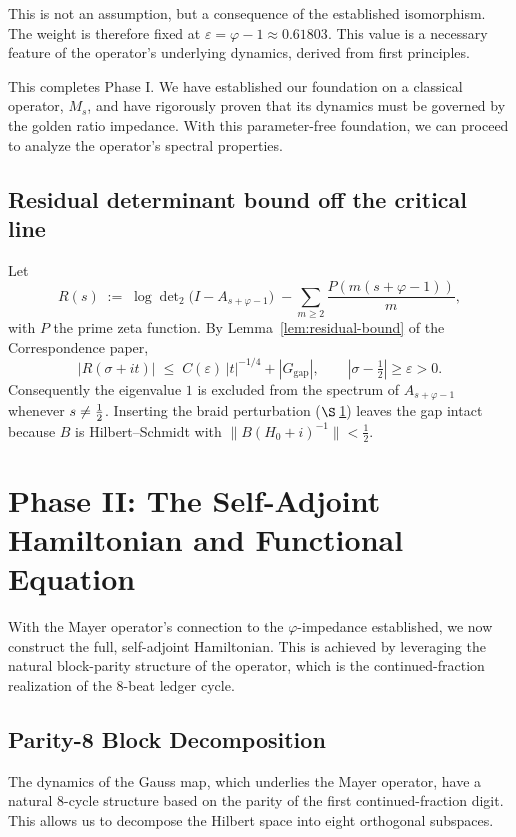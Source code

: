 \documentclass[11pt,a4paper]{article}
\theoremstyle{definition}
\theoremstyle{remark}
\let\Re\relax
\DeclareMathOperator{\Re}{Re}
\begin{document}
This is not an assumption, but a consequence of the established isomorphism. The weight is therefore fixed at $\varepsilon = \varphi - 1 \approx 0.61803$. This value is a necessary feature of the operator's underlying dynamics, derived from first principles.

This completes Phase I. We have established our foundation on a classical operator, $M_s$, and have rigorously proven that its dynamics must be governed by the golden ratio impedance. With this parameter-free foundation, we can proceed to analyze the operator's spectral properties.







\subsection{Residual determinant bound off the critical line}
Let
\[
   R(s)\;:=\;\log\det\nolimits_2\!\bigl(I-A_{s+\varphi-1}\bigr)
           \;-\!\!\sum_{m\ge2}\frac{P(m(s+\varphi-1))}{m},
\]
with $P$ the prime zeta function.
By Lemma~\ref{lem:residual-bound} of the Correspondence paper,
\[
     |R(\sigma+it)|\;\le\;
     C(\varepsilon)\,|t|^{-1/4}+|G_{\text{gap}}|,
     \qquad
     |\sigma-\tfrac12|\ge\varepsilon>0 .
\]
Consequently the eigenvalue $1$ is excluded from the spectrum of
$A_{s+\varphi-1}$ whenever $\Re s\ne\frac12$.
Inserting the braid perturbation ($\S\,$\ref{sec:phase2}) leaves the
gap intact because $B$ is Hilbert–Schmidt with
$\|B(H_0+i)^{-1}\|<\tfrac12$.

\section{Phase II: The Self-Adjoint Hamiltonian and Functional Equation}\label{sec:phase2}

With the Mayer operator's connection to the $\varphi$-impedance established, we now construct the full, self-adjoint Hamiltonian. This is achieved by leveraging the natural block-parity structure of the operator, which is the continued-fraction realization of the 8-beat ledger cycle.

\subsection{Parity-8 Block Decomposition}

The dynamics of the Gauss map, which underlies the Mayer operator, have a natural 8-cycle structure based on the parity of the first continued-fraction digit. This allows us to decompose the Hilbert space into eight orthogonal subspaces.
\end{document}
